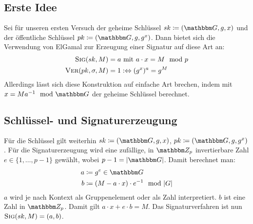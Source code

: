 \subsection{Erste Idee} 
Sei für unseren ersten Versuch der geheime
Schlüssel $\skey \coloneqq (\G, g, x)$ und der öffentliche Schlüssel $\pkey \coloneqq
(\G, g, g^x)$. Dann bietet sich die Verwendung von ElGamal zur Erzeugung
einer Signatur auf diese Art an:
\begin{align*} 
  \textsc{Sig}(sk,M) &= a \text{ mit } a \cdot x = M \mod p \\  
  \textsc{Ver}(pk,\sigma,M) &= 1 :\Leftrightarrow (g^x)^a =  g^M
\end{align*} 
Allerdings lässt sich diese Konstruktion auf einfache Art
brechen, indem mit $x = M a^{-1} \mod \G$ der geheime Schlüssel
berechnet.
\subsection{Schlüssel- und Signaturerzeugung} 
Für die Schlüssel gilt weiterhin $\skey \coloneqq (\G, g, x)$, $\pkey \coloneqq (\G, g,
g^x)$.  Für die Signaturerzeugung wird eine zufällige, in $\Z{p}$
invertierbare Zahl $e \in \{1, \dots, p - 1\}$ gewählt, wobei
$p-1=|\G|$. Damit berechnet man:
\begin{align*} 
  a &\coloneqq g^e \in \G\\ 
  b &\coloneqq (M - a \cdot x) \cdot e^{-1} \mod |G|
\end{align*} 
$a$ wird je nach Kontext als Gruppenelement oder als Zahl interpretiert.
$b$ ist eine Zahl in $\Z{p}$.  Damit gilt $a \cdot x + e \cdot b =
M$. Das Signaturverfahren ist nun $\textsc{Sig}(sk,M) = (a, b)$.

